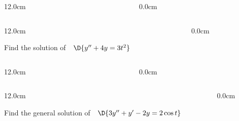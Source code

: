 \begin{frame}
\begin{columns}
\begin{column}{12.0cm}
\vspace{1.0cm}

\end{column}\begin{column}{0.0cm}\end{column}\end{columns}
\end{frame}

\begin{frame}
\begin{columns}\begin{column}{12.0cm}

\scriptsize

\EX Find the solution of \,\, $\D{y''+4y = 3t^2}$

\vspace{9.2cm}

\end{column}\begin{column}{0.0cm}\end{column}\end{columns}
\end{frame}

\begin{frame}
\begin{columns}\begin{column}{12.0cm}

\scriptsize
	
\end{column}\begin{column}{0.0cm}\end{column}\end{columns}
\end{frame}

\begin{frame}
\begin{columns}\begin{column}{12.0cm}

\scriptsize

\EX Find the general solution of \,\, $\D{3y''+y'-2y=2\cos t}$

\vspace{9.2cm}

\end{column}\begin{column}{0.0cm}\end{column}\end{columns}
\end{frame}

